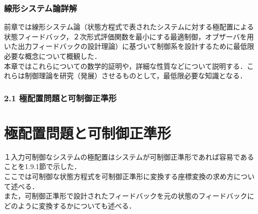 \begin{frame}[t]
\frametitle{線形システム論詳解}


前章では線形システム論（状態方程式で表されたシステムに対する極配置による状態フィードバック，２次形式評価関数を最小にする最適制御，オブザーバを用いた出力フィードバックの設計理論）に基づいて制御系を設計するために最低限必要な概念について概観した．
\\[3mm]

本章ではこれらについての数学的証明や，詳細な性質などについて説明する．これらは制御理論を研究（発展）させるものとして，最低限必要な知識となる．

\end{frame}

\begin{frame}[t]
\frametitle{2.1 極配置問題と可制御正準形}


\section{極配置問題と可制御正準形 \label{sec_c_canonical}}
１入力可制御なシステムの極配置はシステムが可制御正準形であれば容易であることを1.9.1節で示した．
\\[3mm]

ここでは可制御な状態方程式を可制御正準形に変換する座標変換の求め方について述べる．
\\[3mm]

また，可制御正準形で設計されたフィードバックを元の状態のフィードバックにどのように変換するかについても述べる．
\end{frame}

